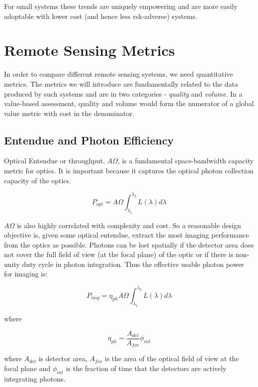 \documentclass[10pt,journal]{IEEEtran}  %
\begin{document}
For small systems these trends are uniquely empowering and are more easily adoptable with lower cost (and hence less rsk-adverse) systems.

\section{Remote Sensing Metrics}
\label{sec:Metrics}
In order to compare different remote sensing systems, we need quantitative metrics.  The metrics we will introduce are fundamentally related to the data produced by such systems and are in two categories - \emph{quality} and \emph{volume}.  In a value-based assessment, quality and volume would form the numerator of a global value metric with cost in the denominator.

\subsection{Entendue and Photon Efficiency}
\label{sec:entendue}

Optical Entendue or throughput, $A \Omega$, is a fundamental space-bandwidth capacity metric for optics.  It is important because it captures the optical photon collection capacity of the optics. 

\begin{equation}
    P_{opt} = A\Omega \int_{\lambda_1}^{\lambda_2}L(\lambda) d\lambda 
\end{equation}

$A\Omega$ is also highly correlated with complexity and cost.  So a reasonable design objective is, given some optical entendue, extract the most imaging performance from the optics as possible.
Photons can be lost spatially if the detector area does not cover the full field of view (at the focal plane) of the optic or if there is non-unity duty cycle in photon integration.  Thus the effective usable photon power for imaging is:

\begin{equation}
    P_{img} = \eta_{ph} A \Omega \int_{\lambda_1}^{\lambda_2}L(\lambda) d\lambda 
\end{equation}

where

\begin{equation}
    \eta_{ph} = \frac{A_{det}}{A_{fov}} \phi_{int}
\end{equation}

where $A_{det}$ is detector area, $A_{fov}$ is the area of the optical field of view at the focal plane and $\phi_{int}$ is the fraction of time that the detectors are actively integrating photons.  
\end{document}
